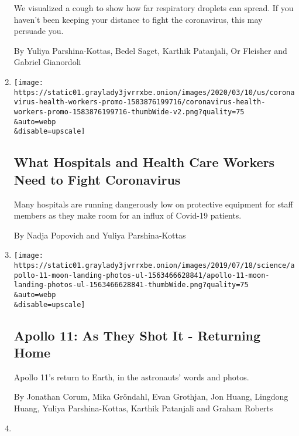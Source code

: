 \begin{enumerate}
  We visualized a cough to show how far respiratory droplets can spread.
  If you haven't been keeping your distance to fight the coronavirus,
  this may persuade you.

  By Yuliya Parshina-Kottas, Bedel Saget, Karthik Patanjali, Or Fleisher
  and Gabriel Gianordoli
\item
  \href{/interactive/2020/03/11/us/virus-health-workers.html}{}

  \texttt{[image: https://static01.graylady3jvrrxbe.onion/images/2020/03/10/us/coronavirus-health-workers-promo-1583876199716/coronavirus-health-workers-promo-1583876199716-thumbWide-v2.png?quality=75\\\&auto=webp\\\&disable=upscale]}

  \hypertarget{what-hospitals-and-health-care-workers-need-to-fight-coronavirus}{%
  \subsection{What Hospitals and Health Care Workers Need to Fight
  Coronavirus}\label{what-hospitals-and-health-care-workers-need-to-fight-coronavirus}}

  Many hospitals are running dangerously low on protective equipment for
  staff members as they make room for an influx of Covid-19 patients.

  By Nadja Popovich and Yuliya Parshina-Kottas
\item
  \href{/interactive/2019/07/18/science/apollo-11-moon-earth-photos-ul.html}{}

  \texttt{[image: https://static01.graylady3jvrrxbe.onion/images/2019/07/18/science/apollo-11-moon-landing-photos-ul-1563466628841/apollo-11-moon-landing-photos-ul-1563466628841-thumbWide.png?quality=75\\\&auto=webp\\\&disable=upscale]}

  \hypertarget{apollo-11-as-they-shot-it---returning-home}{%
  \subsection{Apollo 11: As They Shot It - Returning
  Home}\label{apollo-11-as-they-shot-it---returning-home}}

  Apollo 11's return to Earth, in the astronauts' words and photos.

  By Jonathan Corum, Mika Gröndahl, Evan Grothjan, Jon Huang, Lingdong
  Huang, Yuliya Parshina-Kottas, Karthik Patanjali and Graham Roberts
\item
  \href{/interactive/2019/07/18/science/apollo-11-as-they-shot-it-ul.html}{}


\end{enumerate}

